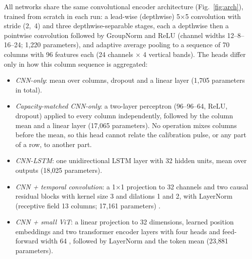 \documentclass{wlscirep}
\begin{document}
All networks share the same convolutional encoder architecture (Fig.~\ref{fig:arch}), trained from scratch in each run: a lead-wise (depthwise) 5$\times$5 convolution with stride (2,~4) and three depthwise-separable stages, each a depthwise then a pointwise convolution followed by GroupNorm and ReLU (channel widths 12--8--16--24; 1{,}220 parameters), and adaptive average pooling to a sequence of 70 columns with 96 features each (24 channels $\times$ 4 vertical bands). The heads differ only in how this column sequence is aggregated:
\begin{itemize}
\item \emph{CNN-only}: mean over columns, dropout and a linear layer (1{,}705 parameters in total).
\item \emph{Capacity-matched CNN-only}: a two-layer perceptron (96--96--64, ReLU, dropout) applied to every column independently, followed by the column mean and a linear layer (17{,}065 parameters). No operation mixes columns before the mean, so this head cannot relate the calibration pulse, or any part of a row, to another part.
\item \emph{CNN-LSTM}: one unidirectional LSTM layer \cite{hochreiter1997lstm} with 32 hidden units, mean over outputs (18{,}025 parameters).
\item \emph{CNN + temporal convolution}: a 1$\times$1 projection to 32 channels and two causal residual blocks with kernel size 3 and dilations 1 and 2, with LayerNorm (receptive field 13 columns; 17{,}161 parameters) \cite{bai2018tcn}.
\item \emph{CNN + small ViT}: a linear projection to 32 dimensions, learned position embeddings and two transformer encoder layers with four heads and feed-forward width 64 \cite{vaswani2017attention,dosovitskiy2021vit}, followed by LayerNorm and the token mean (23{,}881 parameters).
\end{itemize}
\end{document}
